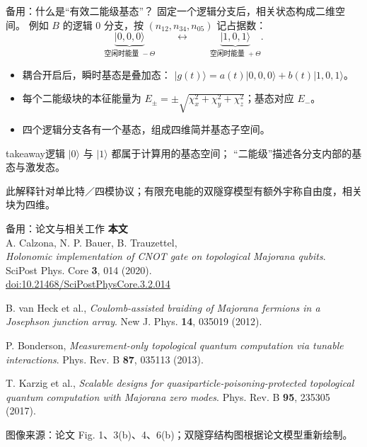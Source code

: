\documentclass[aspectratio=169,11pt]{beamer}
\newcommand{\deckpage}{\insertframenumber\,/\,13}
\newcommand{\source}[1]{{\par\vspace{0.1cm}\fontsize{7.5}{10}\selectfont\color{Muted}#1\par}}
\newcommand{\takeaway}[1]{%
  \begin{beamercolorbox}[wd=\linewidth,sep=0.6em]{takeaway}\small #1\end{beamercolorbox}}
\newcommand{\ket}[1]{\lvert #1\rangle}
\begin{document}
\appendix
\renewcommand{\deckpage}{备用页}

\begin{frame}[t]{备用：什么是“有效二能级基态”？}
  \small
  固定一个逻辑分支后，相关状态构成二维空间。
  例如 $B$ 的逻辑 $0$ 分支，按 $(n_{12},n_{34},n_{05})$ 记占据数：
  \[
    \underbrace{\ket{0,0,0}}_{\text{空闲时能量 }-\Theta}
    \qquad\longleftrightarrow\qquad
    \underbrace{\ket{1,0,1}}_{\text{空闲时能量 }+\Theta}.
  \]
  \begin{itemize}\setlength{\itemsep}{0.16cm}
    \item 耦合开启后，瞬时基态是叠加态：
      $\ket{g(t)}=a(t)\ket{0,0,0}+b(t)\ket{1,0,1}$。
    \item 每个二能级块的本征能量为
      $E_\pm=\pm\sqrt{\chi_x^2+\chi_y^2+\chi_z^2}$；基态对应 $E_-$。
    \item 四个逻辑分支各有一个基态，组成四维简并基态子空间。
  \end{itemize}
  \vspace{0.2cm}
  \takeaway{逻辑 $\ket{0}$ 与 $\ket{1}$ 都属于计算用的基态空间；
  “二能级”描述各分支内部的基态与激发态。}
  \source{此解释针对单比特／四模协议；有限充电能的双隧穿模型有额外宇称自由度，相关块为四维。}
\end{frame}

\begin{frame}[t,shrink=2]{备用：论文与相关工作}
  \small
  \textbf{本文}\\[0.1cm]
  A. Calzona, N. P. Bauer, B. Trauzettel,\\
  \emph{Holonomic implementation of CNOT gate on topological Majorana qubits}.\\
  SciPost Phys. Core \textbf{3}, 014 (2020).\\
  \href{https://doi.org/10.21468/SciPostPhysCore.3.2.014}{doi:10.21468/SciPostPhysCore.3.2.014}
  \vspace{0.35cm}
  \begin{description}\setlength{\itemsep}{0.18cm}
    \item[{[31]}] B. van Heck et al.,
      \emph{Coulomb-assisted braiding of Majorana fermions in a Josephson junction array}.
      New J. Phys. \textbf{14}, 035019 (2012).
    \item[{[34]}] P. Bonderson,
      \emph{Measurement-only topological quantum computation via tunable interactions}.
      Phys. Rev. B \textbf{87}, 035113 (2013).
    \item[{[35]}] T. Karzig et al.,
      \emph{Scalable designs for quasiparticle-poisoning-protected topological quantum computation with Majorana zero modes}.
      Phys. Rev. B \textbf{95}, 235305 (2017).
  \end{description}
  \source{图像来源：论文 Fig. 1、3(b)、4、6(b)；双隧穿结构图根据论文模型重新绘制。}
\end{frame}
\end{document}
